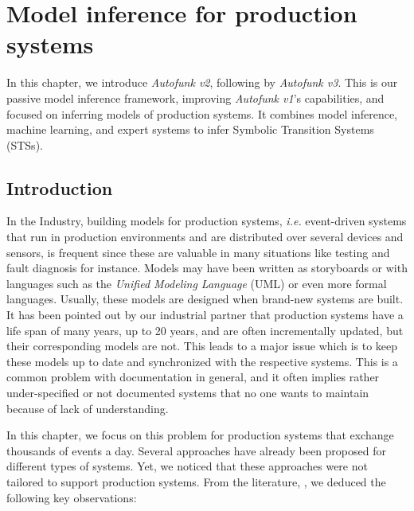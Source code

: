 \chapter{Model inference for production systems}
\label{sec:modelinf:prodsystems}

In this chapter, we introduce \emph{Autofunk v2}, following by
\emph{Autofunk v3}. This is our passive model inference
framework, improving \emph{Autofunk v1}'s capabilities, and
focused on inferring models of production systems. It combines
model inference, machine learning, and expert systems to infer
Symbolic Transition Systems (STSs).\\

\minitoc

\pagebreak

\section{Introduction}

In the Industry, building models for production systems,
\emph{i.e.} event-driven systems that run in production
environments and are distributed over several devices and
sensors, is frequent since these are valuable in many situations
like testing and fault diagnosis for instance. Models may have
been written as storyboards or with languages such as the \emph{Unified
Modeling Language} (UML) or even more formal languages. Usually,
these models are designed when brand-new systems are built. It
has been pointed out by our industrial partner that production
systems have a life span of many years, up to 20 years, and are
often incrementally updated, but their corresponding models are
not.  This leads to a major issue which is to keep these models
up to date and synchronized with the respective systems. This is
a common problem with documentation in general, and it often
implies rather under-specified or not documented systems that no
one wants to maintain because of lack of understanding.

In this chapter, we focus on this problem for production systems
that exchange thousands of events a day. Several approaches have
already been proposed for different types of systems.  Yet, we
noticed that these approaches were not tailored to support
production systems. From the literature,
, we deduced the
following key observations:


